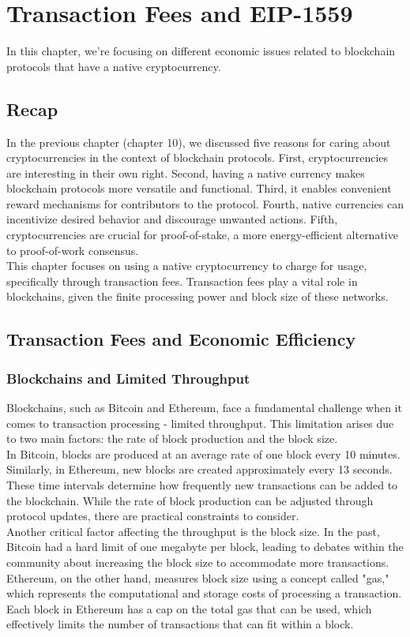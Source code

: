 \chapter{Transaction Fees and EIP-1559}
In this chapter, we're focusing on different economic issues related to blockchain protocols that have a native cryptocurrency.
\section{Recap}
In the previous chapter (chapter 10), we discussed five reasons for caring about cryptocurrencies in the context of blockchain protocols. First, cryptocurrencies are interesting in their own right. Second, having a native currency makes blockchain protocols more versatile and functional. Third, it enables convenient reward mechanisms for contributors to the protocol. Fourth, native currencies can incentivize desired behavior and discourage unwanted actions. Fifth, cryptocurrencies are crucial for proof-of-stake, a more energy-efficient alternative to proof-of-work consensus.\\
This chapter focuses on using a native cryptocurrency to charge for usage, specifically through transaction fees. Transaction fees play a vital role in blockchains, given the finite processing power and block size of these networks.

\section{Transaction Fees and Economic Efficiency}
\subsection{Blockchains and Limited Throughput}
Blockchains, such as Bitcoin and Ethereum, face a fundamental challenge when it comes to transaction processing - limited throughput. This limitation arises due to two main factors: the rate of block production and the block size.\\

In Bitcoin, blocks are produced at an average rate of one block every 10 minutes. Similarly, in Ethereum, new blocks are created approximately every 13 seconds. These time intervals determine how frequently new transactions can be added to the blockchain. While the rate of block production can be adjusted through protocol updates, there are practical constraints to consider.\\

Another critical factor affecting the throughput is the block size. In the past, Bitcoin had a hard limit of one megabyte per block, leading to debates within the community about increasing the block size to accommodate more transactions. Ethereum, on the other hand, measures block size using a concept called "gas," which represents the computational and storage costs of processing a transaction. Each block in Ethereum has a cap on the total gas that can be used, which effectively limits the number of transactions that can fit within a block.\\

